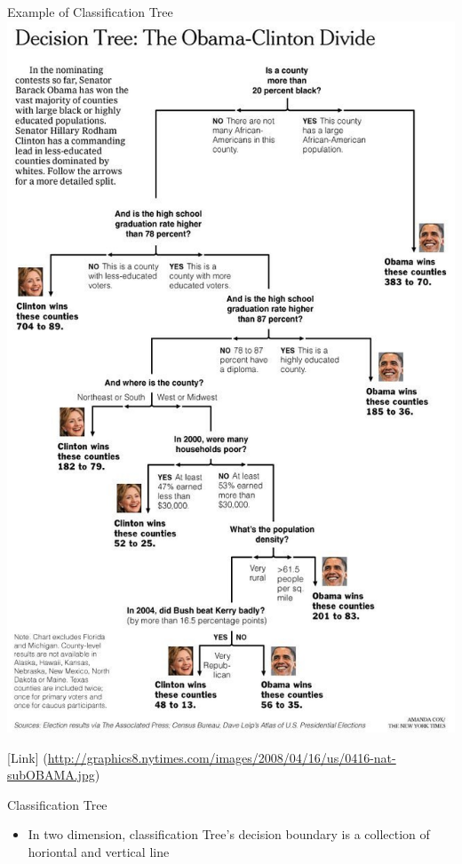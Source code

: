 \documentclass[
  ignorenonframetext,
]{beamer}
\providecommand{\tightlist}{%
  \setlength{\itemsep}{0pt}\setlength{\parskip}{0pt}}
\begin{document}
\begin{frame}{Example of Classification Tree}
\protect\hypertarget{example-of-classification-tree}{}
\includegraphics{images/tree2.jpg}

{[}Link{]}
(\url{http://graphics8.nytimes.com/images/2008/04/16/us/0416-nat-subOBAMA.jpg})
\end{frame}

\begin{frame}{Classification Tree}
\protect\hypertarget{classification-tree}{}
\begin{itemize}
\tightlist
\item
  In two dimension, classification Tree's decision boundary is a
  collection of horiontal and vertical line
\end{itemize}
\end{frame}
\end{document}
